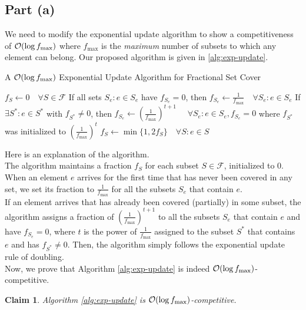 \documentclass[11pt]{article}
\newtheorem{claim}{Claim}
\newcommand{\bigO}{{\cal O}}
\begin{document}
\subsection*{Part (a)}
We need to modify the exponential update algorithm to show a competitiveness of $\bigO(\log{f_{\max}})$
where $f_{\max}$ is the \textit{maximum} number of subsets to which any element can belong.
Our proposed algorithm is given in \ref{alg:exp-update}.
\begin{algorithm}
    \caption{A $\bigO(\log{f_{\max}})$ Exponential Update Algorithm for Fractional Set Cover}
    \label{alg:exp-update}
    \begin{algorithmic}[1]
        \State $f_{S} \gets 0 \quad \forall S \in \mathcal{F}$
            \State If all sets $S_{e} : e \in S_{e}$ have $f_{S_{e}} = 0$, then $f_{S_{e}} \gets \frac{1}{f_{\max}} \quad \forall S_{e} : e \in S_{e}$
            \State If $\exists S^{*} : e \in S^{*}$ with $f_{S^{*}} \neq 0$, then $f_{S_{e}} \gets \left(\frac{1}{f_{\max}}\right)^{t+1}$
            $\quad \forall S_{e} : e \in S_{e}, f_{S_{e}} = 0$ where $f_{S^{*}}$ was initialized to $\left(\frac{1}{f_{\max}}\right)^{t}$
                \State $f_{S} \gets \min{ \{ 1, 2 f_{S} \} } \quad \forall S: e \in S$
            \EndWhile
        \EndWhile
    \end{algorithmic}
\end{algorithm}
Here is an explanation of the algorithm. \\
The algorithm maintains a fraction $f_{S}$ for each subset $S \in \mathcal{F}$, initialized to 0.
When an element $e$ arrives for the first time that has never been covered in any set, we set its fraction to
$\frac{1}{f_{\max}}$ for all the subsets $S_{e}$ that contain $e$. \\
If an element arrives that has already been covered (partially) in some subset, the algorithm
assigns a fraction of $\left(\frac{1}{f_{\max}}\right)^{t+1}$ to all the subsets $S_{e}$ that
contain $e$ and have $f_{S_{e}} = 0$, where $t$ is the power of $\frac{1}{f_{\max}}$ assigned
to the subset $S^{*}$ that contains $e$ and has $f_{S^{*}} \neq 0$. Then, the algorithm simply follows the exponential update rule of doubling. \\
Now, we prove that Algorithm \ref{alg:exp-update} is indeed $\bigO(\log{f_{\max}})$-competitive.
\begin{claim}
    Algorithm \ref{alg:exp-update} is $\bigO(\log{f_{\max}})$-competitive.
\end{claim}
\end{document}
